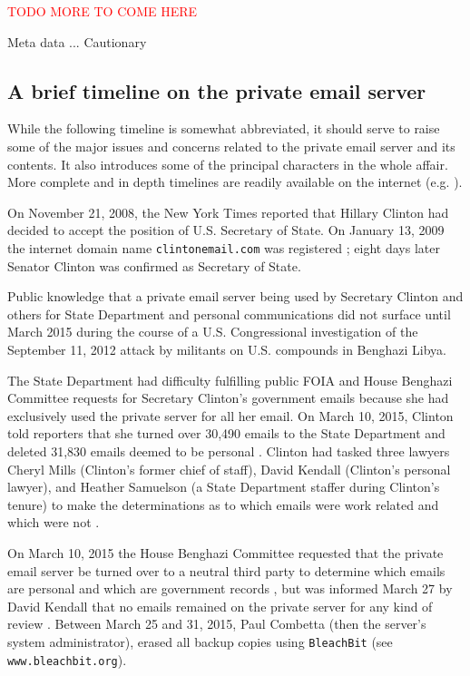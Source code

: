 \documentclass[journal]{vgtc}                %
\newcommand*{\TODO}[1]{\textcolor{red}{TODO #1}}
\begin{document}
\TODO{MORE TO COME HERE}

Meta data ...  Cautionary

\subsection{A brief timeline on the private email server}
While the following timeline is somewhat abbreviated, it should serve to raise some of the major issues and concerns related to the private email server and its contents.  It also introduces some of the principal characters in the whole affair.  More complete and in depth timelines are readily available on the internet (e.g. \cite{attkissonTimeline, thompsonTimeline, WashPostTimeline, clintonWikipedia, TimeMagEverything}).

On November 21, 2008, the New York Times reported that Hillary Clinton had decided to accept the position of U.S. Secretary of State.  On January 13, 2009 the internet domain name \texttt{clintonemail.com} was registered \cite{whoisClintonserver}; eight days later Senator Clinton was confirmed as Secretary of State.  

Public knowledge that a private email server being used by Secretary Clinton and others for State Department and personal communications did not surface until March 2015 \cite{NewYorkTimes2015} during the course of a U.S. Congressional investigation \cite{BenghaziReport} of the September 11, 2012 attack by militants on U.S. compounds in Benghazi Libya.  

The State Department had difficulty fulfilling public FOIA and House Benghazi Committee requests \cite{TakingRootWashPost} for Secretary Clinton's government emails because she had exclusively used the private server for all her email.  On March 10, 2015,  Clinton told reporters that she turned over 30,490 emails to the State Department and deleted 31,830 emails deemed to be personal \cite{WashPostTimeline}.    Clinton had tasked three lawyers Cheryl Mills (Clinton's former chief of staff),  David Kendall (Clinton's personal lawyer), and Heather Samuelson (a State Department staffer during Clinton's tenure) to make the determinations as to which emails were work related and which were not \cite{emailVetting, thompsonTimeline}.   

On March 10, 2015 the House Benghazi Committee requested that the private email server be turned over to a neutral third party to determine which emails are personal and which are government records \cite{serverRequest}, but was informed March 27 by David Kendall that no emails remained on the private server for any kind of review \cite{severScrubbedLawyer}.
Between March 25 and 31, 2015, Paul Combetta (then the server's system administrator), erased all backup copies using \texttt{BleachBit} (see \texttt{www.bleachbit.org}).    
\end{document}
